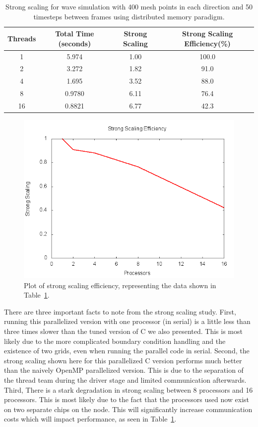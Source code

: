 \documentclass[12pt]{article}
\begin{document}
\begin{table}[h]
	\begin{center}
		\begin{tabular}{|c c c c|}
			\hline
			Threads & Total Time (seconds) & Strong Scaling & Strong Scaling Efficiency(\%) \\ \hline
			1 & 5.974 & 1.00  & 100.0 \\ \hline
			2 & 3.272 & 1.82 &  91.0 \\ \hline
			4 & 1.695 &  3.52&  88.0  \\ \hline
			8 & 0.9780 &  6.11&  76.4  \\ \hline
			16 & 0.8821 & 6.77 &  42.3 \\ \hline
		\end{tabular}
		\caption{Strong scaling for wave simulation with 400 mesh points in each direction and 50 timesteps between frames using distributed memory paradigm.}
		\label{sscale_c_dist}
	\end{center}
\end{table}

\begin{figure}[h]
	\begin{center}
		\includegraphics[width=0.5\columnwidth]{ssplot_c_dist}
		\caption{Plot of strong scaling efficiency, representing the data shown in Table~\ref{sscale_c_dist}.}
		\label{ssplot_c_dist}
	\end{center}
\end{figure}

There are three important facts to note from the strong scaling study. First, running this parallelized version with one processor (in serial) is a little less than three times slower than the tuned version of C we also presented. This is most likely due to the more complicated boundary condition handling and the existence of two grids, even when running the parallel code in serial. Second, the strong scaling shown here for this parallelized C version performs much better than the naively OpenMP parallelized version. This is due to the separation of the thread team during the driver stage and limited communication afterwards. Third, There is a stark degradation in strong scaling between 8 processors and 16 processors. This is most likely due to the fact that the processors used now exist on two separate chips on the node. This will significantly increase communication costs which will impact performance, as seen in Table~\ref{sscale_c_dist}. 
\end{document}
